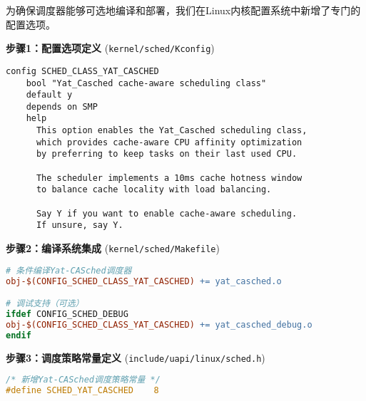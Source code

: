为确保调度器能够可选地编译和部署，我们在Linux内核配置系统中新增了专门的配置选项。

\textbf{步骤1：配置选项定义} (\texttt{kernel/sched/Kconfig})
\begin{tcolorbox} [
    enhanced, colback=blue!5, colframe=blue!40!black, leftrule=3mm, rightrule=0mm, toprule=0mm, bottomrule=0mm, arc=2mm, left=5mm, right=5mm, top=3mm, bottom=3mm, fonttitle=\bfseries, title=\textbf{内核配置选项定义}
]
\begin{lstlisting}[basicstyle=\footnotesize\fontfamily{zi4}\selectfont, showstringspaces=false]
config SCHED_CLASS_YAT_CASCHED
    bool "Yat_Casched cache-aware scheduling class"
    default y
    depends on SMP
    help
      This option enables the Yat_Casched scheduling class,
      which provides cache-aware CPU affinity optimization
      by preferring to keep tasks on their last used CPU.
      
      The scheduler implements a 10ms cache hotness window
      to balance cache locality with load balancing.
      
      Say Y if you want to enable cache-aware scheduling.
      If unsure, say Y.
\end{lstlisting}
\end{tcolorbox}

\textbf{步骤2：编译系统集成} (\texttt{kernel/sched/Makefile})
\begin{tcolorbox} [
    enhanced, colback=green!5, colframe=green!40!black, leftrule=3mm, rightrule=0mm, toprule=0mm, bottomrule=0mm, arc=2mm, left=5mm, right=5mm, top=3mm, bottom=3mm, fonttitle=\bfseries, title=\textbf{编译系统集成}
]
\begin{lstlisting}[language=make, basicstyle=\footnotesize\ttfamily, showstringspaces=false]
# 条件编译Yat-CASched调度器
obj-$(CONFIG_SCHED_CLASS_YAT_CASCHED) += yat_casched.o

# 调试支持（可选）
ifdef CONFIG_SCHED_DEBUG
obj-$(CONFIG_SCHED_CLASS_YAT_CASCHED) += yat_casched_debug.o
endif
\end{lstlisting}
\end{tcolorbox}

\textbf{步骤3：调度策略常量定义} (\texttt{include/uapi/linux/sched.h})
\begin{tcolorbox} [
    enhanced, colback=orange!5, colframe=orange!40!black, leftrule=3mm, rightrule=0mm, toprule=0mm, bottomrule=0mm, arc=2mm, left=5mm, right=5mm, top=3mm, bottom=3mm, fonttitle=\bfseries, title=\textbf{调度策略常量定义}
]
\begin{lstlisting}[language=C, basicstyle=\footnotesize\ttfamily, showstringspaces=false]
/* 新增Yat-CASched调度策略常量 */
#define SCHED_YAT_CASCHED    8
\end{lstlisting}
\end{tcolorbox}

